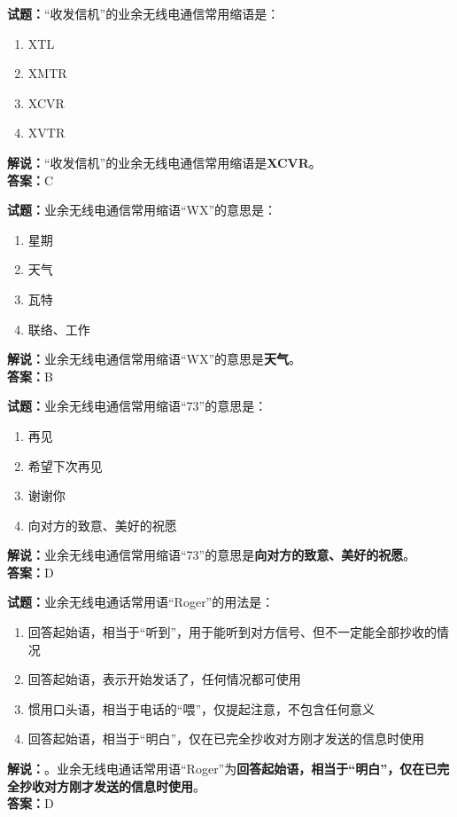 \documentclass{ctexbook}
\begin{document}
\vspace{1em}

\textbf{试题：}“收发信机”的业余无线电通信常用缩语是：
\begin{enumerate}[leftmargin=3em]
  \item XTL
  \item XMTR
  \item XCVR
  \item XVTR
\end{enumerate}
\noindent\textbf{解说：}“收发信机”的业余无线电通信常用缩语是\textbf{XCVR}。\\\noindent\textbf{答案：}C

\vspace{1em}

\textbf{试题：}业余无线电通信常用缩语“WX”的意思是：
\begin{enumerate}[leftmargin=3em]
  \item 星期
  \item 天气
  \item 瓦特
  \item 联络、工作
\end{enumerate}
\noindent\textbf{解说：}业余无线电通信常用缩语“WX”的意思是\textbf{天气}。\\\noindent\textbf{答案：}B

\vspace{1em}

\textbf{试题：}业余无线电通信常用缩语“73”的意思是：
\begin{enumerate}[leftmargin=3em]
  \item 再见
  \item 希望下次再见
  \item 谢谢你
  \item 向对方的致意、美好的祝愿
\end{enumerate}
\noindent\textbf{解说：}业余无线电通信常用缩语“73”的意思是\textbf{向对方的致意、美好的祝愿}。\\\noindent\textbf{答案：}D

\vspace{1em}

\textbf{试题：}业余无线电通话常用语“Roger”的用法是：
\begin{enumerate}[leftmargin=3em]
  \item 回答起始语，相当于“听到”，用于能听到对方信号、但不一定能全部抄收的情况
  \item 回答起始语，表示开始发话了，任何情况都可使用
  \item 惯用口头语，相当于电话的“喂”，仅提起注意，不包含任何意义
  \item 回答起始语，相当于“明白”，仅在已完全抄收对方刚才发送的信息时使用
\end{enumerate}
\noindent\textbf{解说：}。业余无线电通话常用语“Roger”为\textbf{回答起始语，相当于“明白”，仅在已完全抄收对方刚才发送的信息时使用}。\\\noindent\textbf{答案：}D
\end{document}
